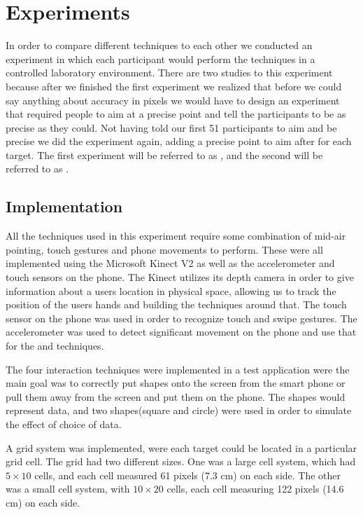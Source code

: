 \section{Experiments} \label{sec:experiment}
In order to compare  different techniques to each other we conducted an experiment in which each participant would perform the techniques in a controlled laboratory environment.
There are two studies to this experiment because after we finished the first experiment we realized that before we could say anything about accuracy in pixels we would have to design an experiment that required people to aim at a precise point and tell the participants to be as precise as they could.
Not having told our first 51 participants to aim and be precise we did the experiment again, adding a precise point to aim after for each target.
The first  experiment will be referred to as \target, and the second will be referred to as \accuracy.

\subsection{Implementation}

All the techniques used in this experiment require some combination of mid-air pointing, touch gestures and phone movements to perform. 
These were all implemented using the Microsoft Kinect V2 as well as the accelerometer and touch sensors on the phone. 
The Kinect utilizes its depth camera in order to give information about a users location in physical space, allowing us to track the position of the users hands and building the techniques around that. 
The touch sensor on the phone was used in order to recognize touch and swipe gestures.
The accelerometer was used to detect significant movement on the phone and use that for the \tilt and \throw techniques. 

The four interaction techniques were implemented in a test application were the main goal was to correctly put shapes onto the screen from the smart phone or pull them away from the screen and put them on the phone.
The shapes would represent data, and two shapes(square and circle) were used in order to simulate the effect of choice of data. 

A grid system was implemented, were each target could be located in a particular grid cell.
The grid had two different sizes.
One was a large cell system, which had $5\times10$ cells, and each cell measured 61 pixels (7.3 cm) on each side.
The other was a small cell system, with $10\times20$ cells, each cell measuring 122 pixels (14.6 cm)  on each side. 

